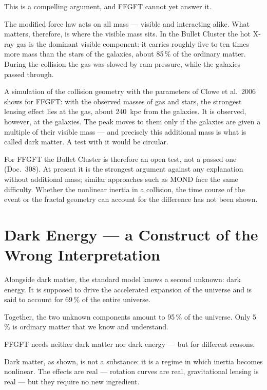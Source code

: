 \documentclass[11pt,oneside]{book}
\begin{document}
This is a compelling argument, and FFGFT cannot yet
answer it.

The modified force law acts on all mass — visible and
interacting alike. What matters, therefore, is where the
visible mass sits. In the Bullet Cluster the hot X-ray gas is
the dominant visible component: it carries roughly five to ten
times more mass than the stars of the galaxies, about 85\,\% of
the ordinary matter. During the collision the gas was slowed
by ram pressure, while the galaxies passed through.

A simulation of the collision geometry with the parameters of
Clowe et al.\ 2006 shows for FFGFT: with the observed masses of
gas and stars, the strongest lensing effect lies at the gas,
about 240~kpc from the galaxies. It is observed, however, at
the galaxies. The peak moves to them only if the galaxies are
given a multiple of their visible mass — and precisely this
additional mass is what is called dark matter. A test with it
would be circular.

For FFGFT the Bullet Cluster is therefore an open test, not a
passed one (Doc.~308). At present it is the strongest argument
against any explanation without additional mass; similar
approaches such as MOND face the same difficulty. Whether the
nonlinear inertia in a collision, the time course of the event
or the fractal geometry can account for the difference has not
been shown.

\chapter{Dark Energy — a Construct of the Wrong Interpretation}

Alongside dark matter, the standard model knows a second
unknown: dark energy. It is supposed to drive the
accelerated expansion of the universe and is said to
account for 69\,\% of the entire universe.

Together, the two unknown components amount to 95\,\% of
the universe. Only 5\,\% is ordinary matter that we know
and understand.

FFGFT needs neither dark matter nor dark energy — but for
different reasons.

Dark matter, as shown, is not a substance: it is a regime
in which inertia becomes nonlinear. The effects are real —
rotation curves are real, gravitational lensing is real —
but they require no new ingredient.
\end{document}
